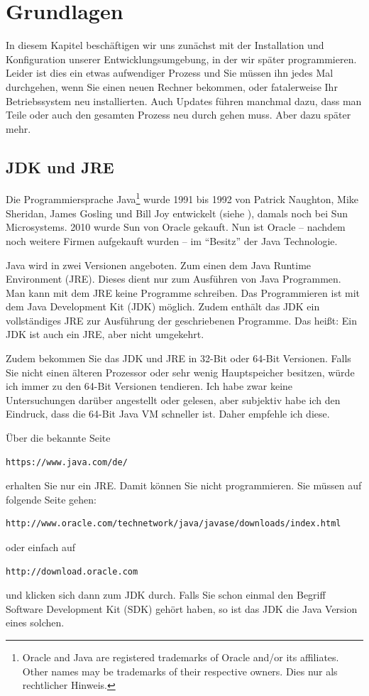 
\chapter{Grundlagen}

In diesem Kapitel beschäftigen wir uns zunächst mit der Installation und Konfiguration unserer Entwicklungsumgebung, in der wir später programmieren. Leider ist dies ein etwas aufwendiger Prozess und Sie müssen ihn jedes Mal durchgehen, wenn Sie einen neuen Rechner bekommen, oder fatalerweise Ihr Betriebssystem neu installierten. Auch Updates führen manchmal dazu, dass man Teile oder auch den gesamten Prozess neu durch gehen muss. Aber dazu später mehr.

\section{JDK und JRE}

Die Programmiersprache Java\footnote{Oracle and Java are registered trademarks of Oracle and/or its affiliates. Other names may be trademarks of their respective owners. Dies nur als rechtlicher Hinweis.} wurde 1991 bis 1992 von Patrick Naughton, Mike Sheridan, James Gosling und Bill Joy entwickelt (siehe \cite{wikijava}), damals noch bei Sun Microsystems. 2010 wurde Sun von Oracle gekauft. Nun ist Oracle -- nachdem noch weitere Firmen aufgekauft wurden -- im "`Besitz"' der Java Technologie. 

Java wird in zwei Versionen angeboten. Zum einen dem Java Runtime Environment (JRE). Dieses dient nur zum Ausführen von Java Programmen. Man kann mit dem JRE keine Programme schreiben. Das Programmieren ist mit dem Java Development Kit (JDK) möglich. Zudem enthält das JDK ein vollständiges JRE zur Ausführung der geschriebenen Programme. Das heißt: Ein JDK ist auch ein JRE, aber nicht umgekehrt. 

Zudem bekommen Sie das JDK und JRE in 32-Bit oder 64-Bit Versionen. Falls Sie nicht einen älteren Prozessor oder sehr wenig Hauptspeicher besitzen, würde ich immer zu den 64-Bit Versionen tendieren. Ich habe zwar keine Untersuchungen darüber angestellt oder gelesen, aber subjektiv habe ich den Eindruck, dass die 64-Bit Java VM schneller ist. Daher empfehle ich diese.

Über die bekannte Seite 

\begin{Verbatim}[fontsize=\small]
https://www.java.com/de/
\end{Verbatim} 
erhalten Sie nur ein JRE. Damit können Sie nicht programmieren. Sie müssen auf folgende Seite gehen:
\begin{Verbatim}[fontsize=\small]
http://www.oracle.com/technetwork/java/javase/downloads/index.html
\end{Verbatim}
oder einfach auf 
\begin{Verbatim}[fontsize=\small]
http://download.oracle.com
\end{Verbatim}
und klicken sich dann zum JDK durch. Falls Sie schon einmal den Begriff Software Development Kit (SDK) gehört haben, so ist das JDK die Java Version eines solchen. 

